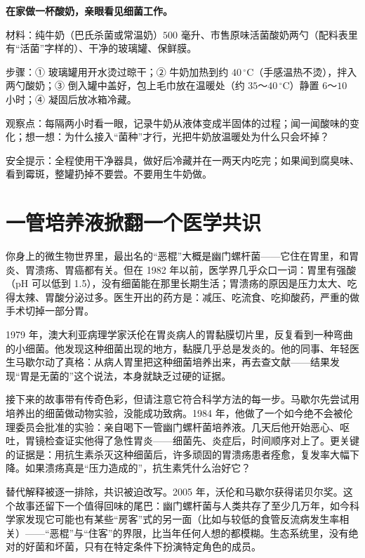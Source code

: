\begin{shiyan}
\textbf{在家做一杯酸奶，亲眼看见细菌工作。}

材料：纯牛奶（巴氏杀菌或常温奶）$500$ 毫升、市售原味活菌酸奶两勺（配料表里有“活菌”字样的）、干净的玻璃罐、保鲜膜。

步骤：① 玻璃罐用开水烫过晾干；② 牛奶加热到约 $40\,^{\circ}\mathrm{C}$（手感温热不烫），拌入两勺酸奶；③ 倒入罐中盖好，包上毛巾放在温暖处（约 $35$～$40\,^{\circ}\mathrm{C}$）静置 $6$～$10$ 小时；④ 凝固后放冰箱冷藏。

观察点：每隔两小时看一眼，记录牛奶从液体变成半固体的过程；闻一闻酸味的变化；想一想：为什么接入“菌种”才行，光把牛奶放温暖处为什么只会坏掉？

安全提示：全程使用干净器具，做好后冷藏并在一两天内吃完；如果闻到腐臭味、看到霉斑，整罐扔掉不要尝。不要用生牛奶做。
\end{shiyan}

\section{一管培养液掀翻一个医学共识}

\begin{zhengju}
你身上的微生物世界里，最出名的“恶棍”大概是幽门螺杆菌——它住在胃里，和胃炎、胃溃疡、胃癌都有关。但在 1982 年以前，医学界几乎众口一词：胃里有强酸（pH 可以低到 1.5），没有细菌能在那里长期生活；胃溃疡的原因是压力太大、吃得太辣、胃酸分泌过多。医生开出的药方是：减压、吃流食、吃抑酸药，严重的做手术切掉一部分胃。

1979 年，澳大利亚病理学家沃伦在胃炎病人的胃黏膜切片里，反复看到一种弯曲的小细菌。他发现这种细菌出现的地方，黏膜几乎总是发炎的。他的同事、年轻医生马歇尔动了真格：从病人胃里把这种细菌培养出来，再去查文献——结果发现“胃是无菌的”这个说法，本身就缺乏过硬的证据。

接下来的故事带有传奇色彩，但请注意它符合科学方法的每一步。马歇尔先尝试用培养出的细菌做动物实验，没能成功致病。1984 年，他做了一个如今绝不会被伦理委员会批准的实验：亲自喝下一管幽门螺杆菌培养液。几天后他开始恶心、呕吐，胃镜检查证实他得了急性胃炎——细菌先、炎症后，时间顺序对上了。更关键的证据是：用抗生素杀灭这种细菌后，许多顽固的胃溃疡患者痊愈，复发率大幅下降。如果溃疡真是“压力造成的”，抗生素凭什么治好它？

替代解释被逐一排除，共识被迫改写。2005 年，沃伦和马歇尔获得诺贝尔奖。这个故事还留下一个值得回味的尾巴：幽门螺杆菌与人类共存了至少几万年，如今科学家发现它可能也有某些“房客”式的另一面（比如与较低的食管反流病发生率相关）——“恶棍”与“住客”的界限，比当年任何人想的都模糊。生态系统里，没有绝对的好菌和坏菌，只有在特定条件下扮演特定角色的成员。
\end{zhengju}


